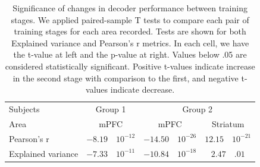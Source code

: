     
    
    \begin{table}[ht]
        \centering
        \begin{tabular}{l|c|c|c}
            \hline
            Subjects & \multicolumn{1}{1}{Group 1} & \multicolumn{2}{1}{Group 2}\\
            Area & mPFC & mPFC & Striatum \\
            \hline
            Pearson's r         & $-8.19 \quad 10^{-12}$ 
                                & $-14.50 \quad 10^{-26}$ 
                                & $12.15 \quad 10^{-21}$ \\
            Explained variance  & $-7.33 \quad 10^{-11}$ 
                                & $-10.84 \quad 10^{-18}$ 
                                & $2.47 \quad .01$\\
            \hline
        \end{tabular}
        \caption[Significance of changes in decoder performance between training stages]{Significance of changes in decoder performance between training stages. We applied paired-sample T tests to compare each pair of training stages for each area recorded. Tests are shown for both Explained variance and Pearson's r metrics. In each cell, we have the t-value at left and the p-value at right. Values below .05 are considered statistically significant. Positive t-values indicate increase in the second stage with comparison to the first, and negative t-values indicate decrease.}
        \label{tab:statistics_learning_stage}
    \end{table}


